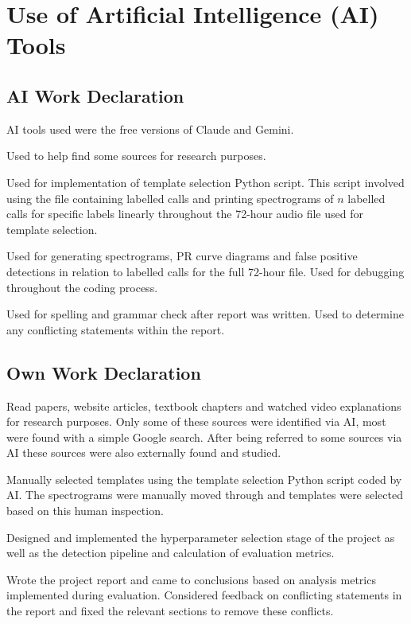 \chapter{Use of Artificial Intelligence (AI) Tools}
\makeatletter{}\makeatother\label{appen:ai}

\section{AI Work Declaration}\label{sec:ai_sec}
\acs{AI} tools used were the free versions of Claude and Gemini.

Used to help find some sources for research purposes.

Used for implementation of template selection Python script. This script involved 
using the file containing labelled calls and printing spectrograms of $n$ labelled 
calls for specific labels linearly throughout the 72-hour audio file used for 
template selection.

Used for generating spectrograms, \acs{PR} curve diagrams and false positive 
detections in relation to labelled calls for the full 72-hour file.
Used for debugging throughout the coding process.

Used for spelling and grammar check after report was written.
Used to determine any conflicting statements within the report.

\section{Own Work Declaration}\label{sec:own_sec}
Read papers, website articles, textbook chapters and watched video explanations 
for research purposes. Only some of these sources were identified via \acs{AI}, most 
were found with a simple Google search. After being referred to 
some sources via \acs{AI} these sources were also externally found and studied.

Manually selected templates using the template selection Python script 
coded by \acs{AI}. The spectrograms were manually moved through and templates 
were selected based on this human inspection.

Designed and implemented the hyperparameter selection stage of the project 
as well as the detection pipeline and calculation of evaluation metrics.

Wrote the project report and came to conclusions based on analysis metrics 
implemented during evaluation.
Considered feedback on conflicting statements in the report and fixed the relevant 
sections to remove these conflicts.